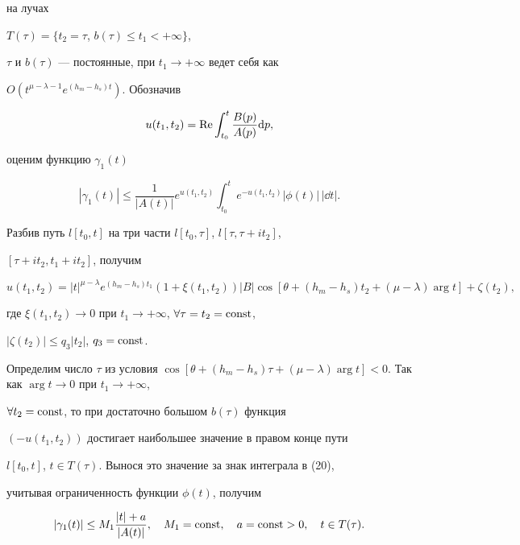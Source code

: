 на лучах {$T(\tau)=\{ t_2=\tau$, $b(\tau)\le t_1<+\infty \}$,


$\tau$ и $b(\tau)$ --- постоянные, при $t_1\to +\infty$ ведет себя как


$O(t^{\mu-\lambda-1}e^{(h_m-h_s)t})$. Обозначив


$$


u(t_1,t_2)=\Ree \int_{t_0}^t \frac{B(p)}{A(p)} \dd p ,


$$


оценим функцию $\gamma_1(t)$


\begin{equation}


|\gamma_1(t)|\le\frac{1}{|A(t)|}e^{u(t_1,t_2)}\int_{t_0}^t


e^{-u(t_1,t_2)}|\phi(t)|\, |\dd t|.


\end{equation}


Разбив путь $l[t_0,t]$ на три части $l[t_0,\tau]$, $l[\tau,\tau+it_2]$,


$[\tau+it_2,t_1+it_2]$, получим


$$


u(t_1,t_2)=|t|^{\mu-\lambda}e^{(h_m-h_s)t_1}(1+\xi(t_1,t_2))|B|


\cos[\theta+(h_m-h_s)t_2+(\mu-\lambda)\arg t]+\zeta(t_2),


$$


где $\xi(t_1,t_2)\to 0$ при $t_1\to +\infty$, $\forall \tau=t_2=\operatorname{const}$,


$|\zeta(t_2)|\le q_3|t_2|$, $q_3=\operatorname{const}$.





Определим число $\tau$ из условия $\cos[\theta+(h_m-h_s)\tau+


(\mu-\lambda)\arg t]<0$. Так как $\arg t\to 0$ при $t_1\to +\infty$,


$\forall t_2=\operatorname{const}$, то при достаточно большом $b(\tau)$ функция


$(-u(t_1,t_2))$ достигает наибольшее значение в правом конце пути


$l[t_0,t]$, $t\in T(\tau)$. Вынося это значение за знак интеграла в (20),


учитывая ограниченность функции $\phi(t)$, получим


\begin{equation}


|\gamma_1(t)|\le M_1 \frac{|t|+a}{|A(t)|}, \quad M_1=\const, \quad


a=\const>0,\quad t\in T(\tau).



\end{equation}}

